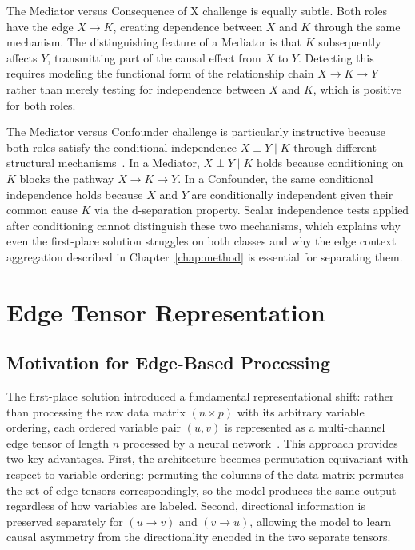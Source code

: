 The Mediator versus Consequence of X challenge is equally subtle. Both roles have the edge $X\to K$, creating dependence between $X$ and $K$ through the same mechanism. The distinguishing feature of a Mediator is that $K$ subsequently affects $Y$, transmitting part of the causal effect from $X$ to $Y$. Detecting this requires modeling the functional form of the relationship chain $X\to K\to Y$ rather than merely testing for independence between $X$ and $K$, which is positive for both roles.

The Mediator versus Confounder challenge is particularly instructive because both roles satisfy the conditional independence $X\perp Y\mid K$ through different structural mechanisms~\cite{peters2017elements}. In a Mediator, $X\perp Y\mid K$ holds because conditioning on $K$ blocks the pathway $X\to K\to Y$. In a Confounder, the same conditional independence holds because $X$ and $Y$ are conditionally independent given their common cause $K$ via the d-separation property. Scalar independence tests applied after conditioning cannot distinguish these two mechanisms, which explains why even the first-place solution struggles on both classes and why the edge context aggregation described in Chapter~\ref{chap:method} is essential for separating them.

\section{Edge Tensor Representation}
\label{sec:edge_tensor}

\subsection{Motivation for Edge-Based Processing}
\label{sec:edge_motivation}

The first-place solution introduced a fundamental representational shift: rather than processing the raw data matrix $(n\times p)$ with its arbitrary variable ordering, each ordered variable pair $(u,v)$ is represented as a multi-channel edge tensor of length $n$ processed by a neural network~\cite{adia_rank1_report}. This approach provides two key advantages. First, the architecture becomes permutation-equivariant with respect to variable ordering: permuting the columns of the data matrix permutes the set of edge tensors correspondingly, so the model produces the same output regardless of how variables are labeled. Second, directional information is preserved separately for $(u\to v)$ and $(v\to u)$, allowing the model to learn causal asymmetry from the directionality encoded in the two separate tensors.

